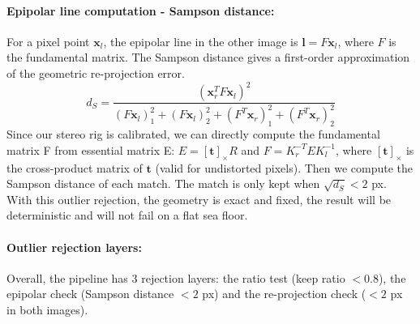 \documentclass[12pt]{article}
\begin{document}
\paragraph{Epipolar line computation - Sampson distance:\label{epipolar}} For a pixel point \(\mathbf{x}_l\), the epipolar line in the other image is \(\mathbf{l} = F\mathbf{x}_l\), where \(F\) is the fundamental matrix. The Sampson distance gives a first-order approximation of the geometric re-projection error. 
\[
d_S =
\frac{
\left(\mathbf{x}_r^T F \mathbf{x}_l\right)^2
}{
(F\mathbf{x}_l)_1^2
+
(F\mathbf{x}_l)_2^2
+
(F^T\mathbf{x}_r)_1^2
+
(F^T\mathbf{x}_r)_2^2
}
\]
Since our stereo rig is calibrated, we can directly compute the fundamental matrix F from essential matrix E: 
\(E = [\mathbf{t}]_\times R\) and \(F = K_r^{-T} E K_l^{-1}\), where \([\mathbf{t}]_\times\) is the cross-product matrix of \(\mathbf{t}\) (valid for undistorted pixels). Then we compute the Sampson distance of each match. The match is only kept when \(\sqrt{d_S}<2\) px. With this outlier rejection, the geometry is exact and fixed, the result will be deterministic and will not fail on a flat sea floor. 
\paragraph{Outlier rejection layers:} Overall, the pipeline has 3 rejection layers: the ratio test (keep ratio $<0.8$), the epipolar check (Sampson distance $<2$ px) and the re-projection check ($<2$ px in both images). 
\end{document}
